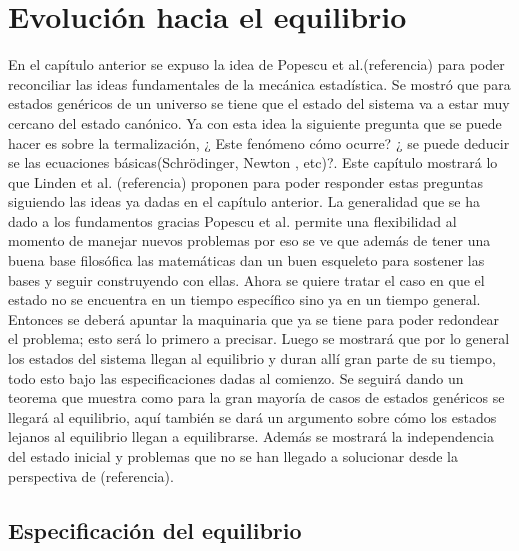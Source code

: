 \chapter{Evolución hacia el equilibrio}

En el capítulo anterior se expuso la idea de Popescu et al.(referencia) para poder reconciliar las ideas fundamentales de la mecánica estadística. Se mostró que para estados genéricos de un universo se tiene que el estado del sistema va a estar muy cercano del estado canónico. Ya con esta idea la siguiente pregunta que se puede hacer es sobre la termalización, ¿ Este fenómeno cómo ocurre? ¿ se puede deducir se las ecuaciones básicas(Schrödinger, Newton , etc)?. Este capítulo mostrará lo que Linden et al. (referencia) proponen para poder responder estas preguntas siguiendo las ideas ya dadas en el capítulo anterior. La generalidad que se ha dado a los fundamentos gracias Popescu et al. permite una flexibilidad al momento de manejar nuevos problemas por eso se ve que además de tener una buena base filosófica las matemáticas dan un buen esqueleto para sostener las bases y seguir construyendo con ellas. Ahora se quiere tratar el caso en que el estado no se encuentra en un tiempo específico sino ya en un tiempo  general. Entonces se deberá apuntar la maquinaria que ya se tiene para poder redondear el problema; esto será lo primero a  precisar. Luego se mostrará que por lo general los estados del sistema llegan al equilibrio y duran allí gran parte de su tiempo, todo esto bajo las especificaciones dadas al comienzo. Se seguirá dando un teorema que muestra como para la gran mayoría de casos de estados genéricos se llegará al equilibrio, aquí también se dará un argumento sobre cómo los estados lejanos al equilibrio  llegan a equilibrarse. Además se mostrará la independencia del estado inicial y problemas que no se han llegado a solucionar desde la perspectiva de (referencia).

\section{Especificación del equilibrio}

